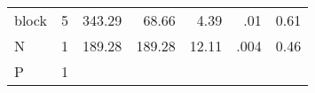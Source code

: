 \documentclass[]{article}
\begin{document}
\begin{longtable}[c]{@{}lrrrrrr@{}}
\begin{minipage}[t]{0.17\columnwidth}
block
\strut\end{minipage} &
\begin{minipage}[t]{0.08\columnwidth}\raggedleft\strut
5
\strut\end{minipage} &
\begin{minipage}[t]{0.08\columnwidth}\raggedleft\strut
343.29
\strut\end{minipage} &
\begin{minipage}[t]{0.08\columnwidth}\raggedleft\strut
68.66
\strut\end{minipage} &
\begin{minipage}[t]{0.07\columnwidth}\raggedleft\strut
4.39
\strut\end{minipage} &
\begin{minipage}[t]{0.07\columnwidth}\raggedleft\strut
.01
\strut\end{minipage} &
\begin{minipage}[t]{0.13\columnwidth}\raggedleft\strut
0.61
\strut\end{minipage}\tabularnewline
\begin{minipage}[t]{0.17\columnwidth}\raggedright\strut
N
\strut\end{minipage} &
\begin{minipage}[t]{0.08\columnwidth}\raggedleft\strut
1
\strut\end{minipage} &
\begin{minipage}[t]{0.08\columnwidth}\raggedleft\strut
189.28
\strut\end{minipage} &
\begin{minipage}[t]{0.08\columnwidth}\raggedleft\strut
189.28
\strut\end{minipage} &
\begin{minipage}[t]{0.07\columnwidth}\raggedleft\strut
12.11
\strut\end{minipage} &
\begin{minipage}[t]{0.07\columnwidth}\raggedleft\strut
.004
\strut\end{minipage} &
\begin{minipage}[t]{0.13\columnwidth}\raggedleft\strut
0.46
\strut\end{minipage}\tabularnewline
\begin{minipage}[t]{0.17\columnwidth}\raggedright\strut
P
\strut\end{minipage} &
\begin{minipage}[t]{0.08\columnwidth}\raggedleft\strut
1
\strut\end{minipage} &
\begin{minipage}[t]{0.08\columnwidth}\raggedleft\strut

\end{minipage}
\end{longtable}
\end{document}
